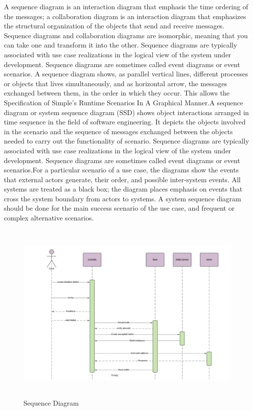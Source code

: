 \documentclass[12pt]{article}
\begin{document}
A sequence diagram is an interaction diagram that emphasis the time
ordering of the messages; a collaboration diagram is an interaction diagram that
emphasizes the structural organization of the objects that send and receive messages.
Sequence diagrams and collaboration diagrams are isomorphic, meaning that you
can take one and transform it into the other. Sequence diagrams are typically
associated with use case realizations in the logical view of the system under
development. Sequence diagrams are sometimes called event diagrams or event
scenarios. A sequence diagram shows, as parallel vertical lines, different processes or
objects that lives simultaneously, and as horizontal arrow, the messages exchanged
between them, in the order in which they occur. This allows the Specification of
Simple’s Runtime Scenarios In A Graphical Manner.A sequence
diagram or system sequence diagram (SSD) shows object interactions arranged in time
sequence in the field of software engineering. It depicts the objects involved in the scenario and the sequence of messages exchanged between the objects needed to carry out
the functionality of scenario. Sequence diagrams are typically associated with use case
realizations in the logical view of the system under development. Sequence diagrams
are sometimes called event diagrams or event scenarios.For a particular scenario of a
use case, the diagrams show the events that external actors generate, their order, and
possible inter-system events. All systems are treated as a black box; the diagram places
emphasis on events that cross the system boundary from actors to systems. A system
sequence diagram should be done for the main success scenario of the use case, and
frequent or complex alternative scenarios.


\begin{figure}[h!]
\begin{center}
\includegraphics[width=17cm, height=9cm]{SEQ}
\caption{Sequence Diagram}
\end{center}
\end{figure}
\end{document}
